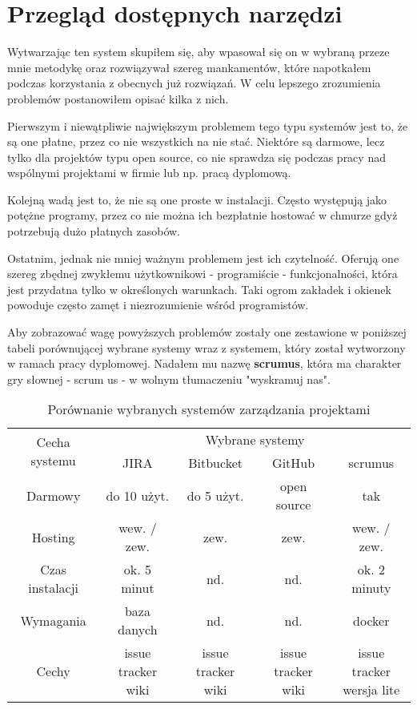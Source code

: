 \section{Przegląd dostępnych narzędzi}
Wytwarzając ten system skupiłem się, aby wpasował się on w wybraną przeze mnie metodykę oraz rozwiązywał szereg mankamentów, które napotkałem podczas korzystania z obecnych już rozwiązań. W celu lepszego zrozumienia problemów postanowiłem opisać kilka z nich.

Pierwszym i niewątpliwie największym problemem tego typu systemów jest to, że są one płatne, przez co nie wszystkich na nie stać. Niektóre są darmowe, lecz tylko dla projektów typu open source, co nie sprawdza się podczas pracy nad wspólnymi projektami w firmie lub np. pracą dyplomową.

Kolejną wadą jest to, że nie są one proste w instalacji. Często występują jako potężne programy, przez co nie można ich bezpłatnie hostować w chmurze gdyż potrzebują dużo płatnych zasobów. 

Ostatnim, jednak nie mniej ważnym problemem jest ich czytelność. Oferują one szereg zbędnej zwykłemu użytkownikowi - programiście - funkcjonalności, która jest przydatna tylko w określonych warunkach. Taki ogrom zakładek i okienek powoduje często zamęt i niezrozumienie wśród programistów.

Aby zobrazować wagę powyższych problemów zostały one zestawione w poniższej tabeli porównującej wybrane systemy wraz z systemem, który został wytworzony w ramach pracy dyplomowej. Nadałem mu nazwę \textbf{scrumus}, która ma charakter gry słownej - scrum us - w wolnym tłumaczeniu "wyskramuj nas".
\begin{table}[h!]
	\caption{Porównanie wybranych systemów zarządzania projektami}
	\centering
	\begin{tabular}{|c|c|c|c|c|}
		\hline
		\multirow{2}{*}{Cecha systemu} & \multicolumn{4}{c|}{Wybrane systemy} \\\cline{2-5} & JIRA & Bitbucket & GitHub & scrumus\\
		\hline
		Darmowy & do 10 użyt. & do 5 użyt. & open source & tak\\
		\hline
		Hosting & wew. / zew. & zew. & zew. & wew. / zew.\\
		\hline
		Czas instalacji & ok. 5 minut & nd. & nd. & ok. 2 minuty\\
		\hline
		Wymagania & baza danych & nd. & nd. & docker\\
		\hline
		Cechy & \specialcell{issue tracker\\ wiki} & \specialcell{issue tracker\\ wiki} & \specialcell{issue tracker\\ wiki} & \specialcell{issue tracker\\ wersja lite}\\
		\hline
		
	\end{tabular}
	\label{tabela:porownanie_systemow}
\end{table}


